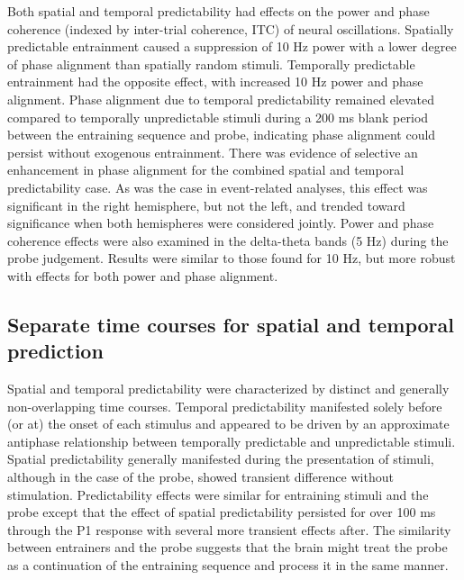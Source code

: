 \documentclass[dwyatte_dissertation.tex]{subfiles}
\begin{document}
Both spatial and temporal predictability had effects on the power and phase coherence (indexed by inter-trial coherence, ITC) of neural oscillations. Spatially predictable entrainment caused a suppression of 10 Hz power with a lower degree of phase alignment than spatially random stimuli. Temporally predictable entrainment had the opposite effect, with increased 10 Hz power and phase alignment. Phase alignment due to temporal predictability remained elevated compared to temporally unpredictable stimuli during a 200 ms blank period between the entraining sequence and probe, indicating phase alignment could persist without exogenous entrainment. There was evidence of selective an enhancement in phase alignment for the combined spatial and temporal predictability case. As was the case in event-related analyses, this effect was significant in the right hemisphere, but not the left, and trended toward significance when both hemispheres were considered jointly. Power and phase coherence effects were also examined in the delta-theta bands (5 Hz) during the probe judgement. Results were similar to those found for 10 Hz, but more robust with effects for both power and phase alignment. 

\subsection{Separate time courses for spatial and temporal prediction}
Spatial and temporal predictability were characterized by distinct and generally non-overlapping time courses. Temporal predictability manifested solely before (or at) the onset of each stimulus and appeared to be driven by an approximate antiphase relationship between temporally predictable and unpredictable stimuli. Spatial predictability generally manifested during the presentation of stimuli, although in the case of the probe, showed transient difference without stimulation. Predictability effects were similar for entraining stimuli and the probe except that the effect of spatial predictability persisted for over 100 ms through the P1 response with several more transient effects after. The similarity between entrainers and the probe suggests that the brain might treat the probe as a continuation of the entraining sequence and process it in the same manner. 
\end{document}
